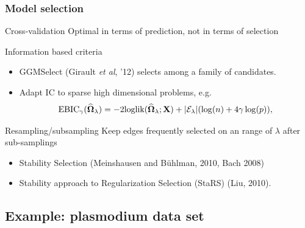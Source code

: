 \begin{frame}
  \frametitle{Model selection}

  \begin{block}{Cross-validation}
    Optimal in terms of \alert{prediction}, not in terms of selection
  \end{block}

  \begin{block}{Information based criteria}
    \begin{itemize}
    \item GGMSelect (Girault \textit{et al}, '12) selects among a family of candidates.
    \item Adapt IC to sparse high dimensional problems, e.g.
    \begin{equation*}
      \text{EBIC}_\gamma(\widehat{{\boldsymbol\Omega}}_\lambda)  =   -2 \textrm{loglik}
      (\widehat{{\boldsymbol\Omega}}_\lambda;\mathbf{X}) + |\mathcal{E}_\lambda| (\log(n) + 4 \gamma \log(p) ),
    \end{equation*}
    \end{itemize}
  \end{block}

  \begin{block}{Resampling/subsampling}
    \alert{Keep edges frequently selected} on an range of $\lambda$ after sub-samplings
    \begin{itemize}
    \item Stability Selection (Meinshausen and B\"uhlman, 2010, Bach 2008)
    \item Stability approach to Regularization Selection (StaRS) (Liu, 2010).
    \end{itemize}
  \end{block}
\end{frame}

\subsection{Example: plasmodium data set}



